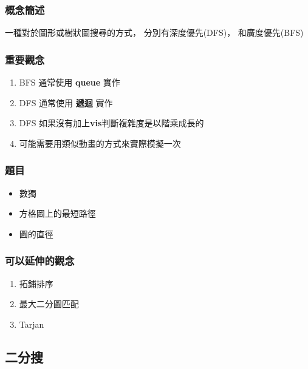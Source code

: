 \documentclass[12pt,oneside]{article}
\begin{document}
\subsubsection*{概念簡述}
一種對於圖形或樹狀圖搜尋的方式，
分別有深度優先(DFS)，
和廣度優先(BFS)


\subsubsection*{重要觀念}
\begin{adjustwidth}{2em}{0em}
\begin{enumerate}
    \item BFS 通常使用 \textbf{queue} 實作
    \item DFS 通常使用 \textbf{遞迴} 實作
    \item DFS 如果沒有加上\textbf{vis}判斷複雜度是以階乘成長的
    \item 可能需要用類似動畫的方式來實際模擬一次
\end{enumerate}
\end{adjustwidth}



\subsubsection*{題目}
\begin{adjustwidth}{2em}{0em}
\begin{itemize}
    \item 數獨
    \item 方格圖上的最短路徑
    \item 圖的直徑
\end{itemize}
\end{adjustwidth}

\subsubsection*{可以延伸的觀念}
\begin{adjustwidth}{2em}{0em}
\begin{enumerate}
    \item 拓鋪排序
    \item 最大二分圖匹配
    \item Tarjan
\end{enumerate}
\end{adjustwidth}

\clearpage
\subsection{二分搜}
\end{document}
